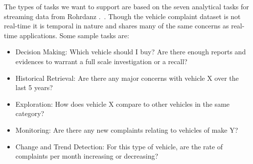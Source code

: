 

The types of tasks we want to support are based on the seven analytical tasks for streaming 
data from Rohrdanz \etal.~\cite{ROH2011a}. Though the vehicle complaint dataset is not real-time it is temporal in nature
and shares many of the same concerns as real-time applications. Some sample 
tasks are:

\begin{itemize}[noitemsep]
   \item Decision Making: Which vehicle should I buy? Are there enough
   reports and evidences to warrant a full scale investigation or a recall?
   \item Historical Retrieval: Are there any major concerns with vehicle X over the last 5 years?
   \item Exploration: How does vehicle X compare to other vehicles in the same category?
   \item Monitoring: Are there any new complaints relating to vehicles of make Y?
   \item Change and Trend Detection: For this type of vehicle, are the rate of complaints per month increasing or decreasing?
\end{itemize}


